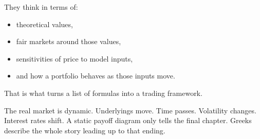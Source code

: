 \documentclass[11pt]{article}
\theoremstyle{definition}
\begin{document}
They think in terms of:
\begin{itemize}
    \item theoretical values,
    \item fair markets around those values,
    \item sensitivities of price to model inputs,
    \item and how a portfolio behaves as those inputs move.
\end{itemize}

That is what turns a list of formulas into a trading framework.

The real market is dynamic. Underlyings move. Time passes. Volatility changes. Interest rates shift. A static payoff diagram only tells the final chapter. Greeks describe the whole story leading up to that ending.
\end{document}
